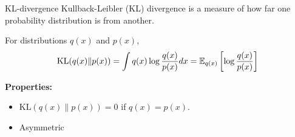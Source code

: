 \documentclass[10pt, compress]{beamer}
\begin{document}
\begin{frame}{KL-divergence}
  Kullback-Leibler (KL) divergence
  is a measure of how far one probability distribution
  is from another.

  \pause
  For distributions $q(x)$ and $p(x)$,
  \begin{align*}
    \textrm{KL}(q(x)\|p(x)) = \int q(x)\log \frac{q(x)}{p(x)}dx = \mathbb{E}_{q(x)}\left[\log\frac{q(x)}{p(x)}\right]
  \end{align*}

  \pause
  \textbf{Properties:}
  \begin{itemize}
    \item $\textrm{KL}(q(x)\|p(x)) = 0$ if $q(x) = p(x)$.
    \item Asymmetric
  \end{itemize}

\end{frame}
\end{document}
